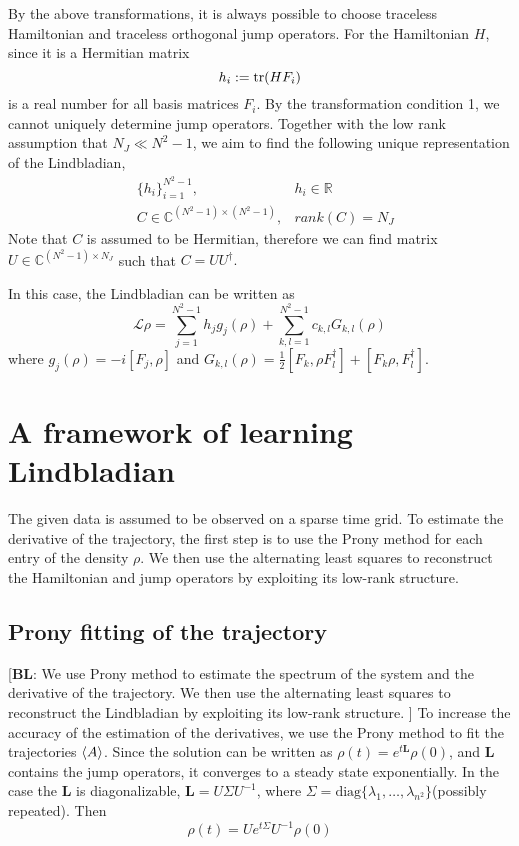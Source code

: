 \documentclass[10pt]{article}  %
\theoremstyle{plain}
\numberwithin{equation}{section}
\def\mL{\mathcal{L}}
\def\R{\mathbb{R}}
\def\C{\mathbb{C}}
\newcommand{\bL}{\mathbf{L}}
\newcommand{\diag}{\text{diag}}
\newcommand{\bl}[1]{{\color{magenta} [\textbf{BL}: #1]}}
\renewcommand{\R}{\mathbb{R}}
\renewcommand{\C}{\mathbb{C}}
\begin{document}
By the above transformations, it is always possible to choose traceless Hamiltonian and traceless orthogonal jump operators. For the Hamiltonian $H$, since it is a Hermitian matrix
\begin{equation}
	h_i:=\tr(HF_i)
\end{equation}
is a real number for all basis matrices $F_i$. By the transformation condition 1, we cannot uniquely determine jump operators. Together with the low rank assumption that $N_J \ll N^2-1$, we aim to find the following unique representation of the Lindbladian, 
\begin{align}
	&\{h_i\}_{i = 1}^{N^2-1}, &h_i \in \R \\
	&C\in\C^{(N^2-1)\times(N^2-1)}, &rank(C) = N_J
\end{align}
Note that $C$ is assumed to be Hermitian, therefore we can find matrix $U \in \C^{(N^2-1)\times N_J}$ such that $C = UU^\dagger.$

In this case, the Lindbladian can be written as 
\begin{equation}
	\mL \rho = \sum_{j= 1}^{N^2-1}h_j g_j(\rho) + \sum_{k, l = 1}^{N^2-1} c_{k, l}G_{k, l}(\rho)
\end{equation}
where $g_j(\rho) = -i[F_j, \rho]$ and $G_{k, l}(\rho) = \frac{1}{2}[F_k, \rho F_l^\dagger] + [F_k \rho, F_l^\dagger]$.

\section{A framework of learning Lindbladian}
The given data is assumed to be observed on a sparse time grid. To estimate the derivative of the trajectory, the first step is to use the Prony method for each entry of the density $\rho$. We then use the alternating least squares to reconstruct the Hamiltonian and jump operators by exploiting its low-rank structure.



\subsection{Prony fitting of the trajectory}
\bl{We use Prony method to estimate the spectrum of the system and the derivative of the trajectory. We then use the alternating least squares to reconstruct the Lindbladian by exploiting its low-rank structure.
}
To increase the accuracy of the estimation of the derivatives, we use the Prony method to fit the trajectories $\expval{A}$. Since the solution can be written as $\rho(t) = e^{t\bL } \rho(0)$, and $\bL$ contains the jump operators, it converges to a steady state exponentially. In the case the $\bL$ is diagonalizable, $\bL = U \Sigma U^{-1}$, where $\Sigma = \diag\{\lambda_1, \dots, \lambda_{n^2}\}$(possibly repeated). Then 
\begin{equation}
	\rho(t) = Ue^{t\Sigma}U^{-1}\rho(0)
\end{equation}
\end{document}
